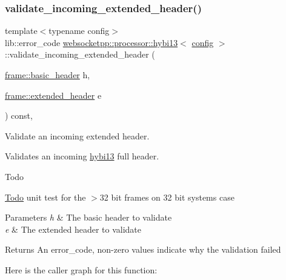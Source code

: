 \subsubsection{\texorpdfstring{validate\+\_\+incoming\+\_\+extended\+\_\+header()}{validate\_incoming\_extended\_header()}}
{\footnotesize\ttfamily template$<$typename config$>$ \\
lib\+::error\+\_\+code \mbox{\hyperlink{classwebsocketpp_1_1processor_1_1hybi13}{websocketpp\+::processor\+::hybi13}}$<$ \mbox{\hyperlink{classconfig}{config}} $>$\+::validate\+\_\+incoming\+\_\+extended\+\_\+header (\begin{DoxyParamCaption}\item[{\mbox{\hyperlink{structwebsocketpp_1_1frame_1_1basic__header}{frame\+::basic\+\_\+header}}}]{h,  }\item[{\mbox{\hyperlink{structwebsocketpp_1_1frame_1_1extended__header}{frame\+::extended\+\_\+header}}}]{e }\end{DoxyParamCaption}) const\hspace{0.3cm}{\ttfamily [inline]}, {\ttfamily [protected]}}



Validate an incoming extended header. 

Validates an incoming \mbox{\hyperlink{classwebsocketpp_1_1processor_1_1hybi13}{hybi13}} full header.

\begin{DoxyRefDesc}{Todo}
\item[\mbox{\hyperlink{todo__todo000022}{Todo}}]unit test for the $>$32 bit frames on 32 bit systems case\end{DoxyRefDesc}



\begin{DoxyParams}{Parameters}
{\em h} & The basic header to validate \\
\hline
{\em e} & The extended header to validate \\
\hline
\end{DoxyParams}
\begin{DoxyReturn}{Returns}
An error\+\_\+code, non-\/zero values indicate why the validation failed 
\end{DoxyReturn}
Here is the caller graph for this function\+:
\mbox{\label{classwebsocketpp_1_1processor_1_1hybi13_a8b3cea2f1526b4982e0836c5705584a8}} 
